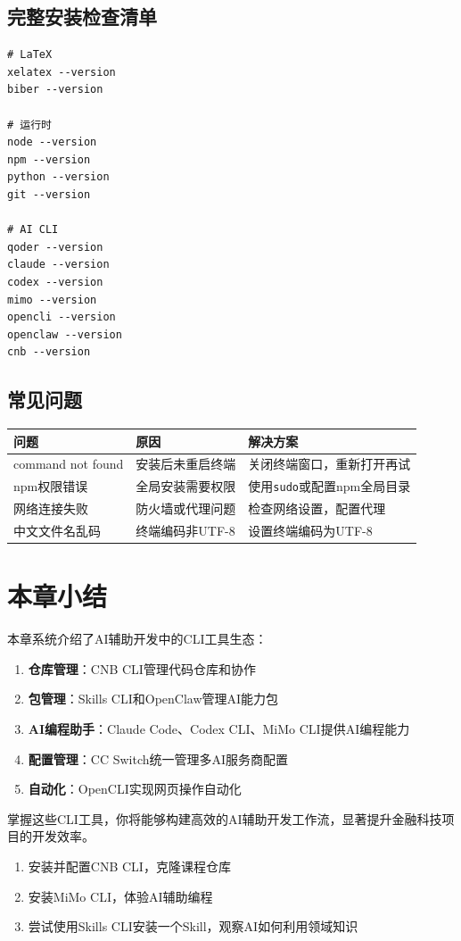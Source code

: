 \subsection{完整安装检查清单}

\begin{lstlisting}[style=shell]
# LaTeX
xelatex --version
biber --version

# 运行时
node --version
npm --version
python --version
git --version

# AI CLI
qoder --version
claude --version
codex --version
mimo --version
opencli --version
openclaw --version
cnb --version
\end{lstlisting}

\subsection{常见问题}

\begin{table}[H]
\centering
\begin{tabular}{p{3cm}p{4cm}p{5cm}}
\toprule
\textbf{问题} & \textbf{原因} & \textbf{解决方案} \\
\midrule
command not found & 安装后未重启终端 & 关闭终端窗口，重新打开再试 \\
npm权限错误 & 全局安装需要权限 & 使用\texttt{sudo}或配置npm全局目录 \\
网络连接失败 & 防火墙或代理问题 & 检查网络设置，配置代理 \\
中文文件名乱码 & 终端编码非UTF-8 & 设置终端编码为UTF-8 \\
\bottomrule
\end{tabular}
\end{table}

\section{本章小结}

本章系统介绍了AI辅助开发中的CLI工具生态：

\begin{enumerate}
  \item \textbf{仓库管理}：CNB CLI管理代码仓库和协作
  \item \textbf{包管理}：Skills CLI和OpenClaw管理AI能力包
  \item \textbf{AI编程助手}：Claude Code、Codex CLI、MiMo CLI提供AI编程能力
  \item \textbf{配置管理}：CC Switch统一管理多AI服务商配置
  \item \textbf{自动化}：OpenCLI实现网页操作自动化
\end{enumerate}

掌握这些CLI工具，你将能够构建高效的AI辅助开发工作流，显著提升金融科技项目的开发效率。

\begin{notebox}[下一步实践]
\begin{enumerate}
  \item 安装并配置CNB CLI，克隆课程仓库
  \item 安装MiMo CLI，体验AI辅助编程
  \item 尝试使用Skills CLI安装一个Skill，观察AI如何利用领域知识
\end{enumerate}
\end{notebox}
